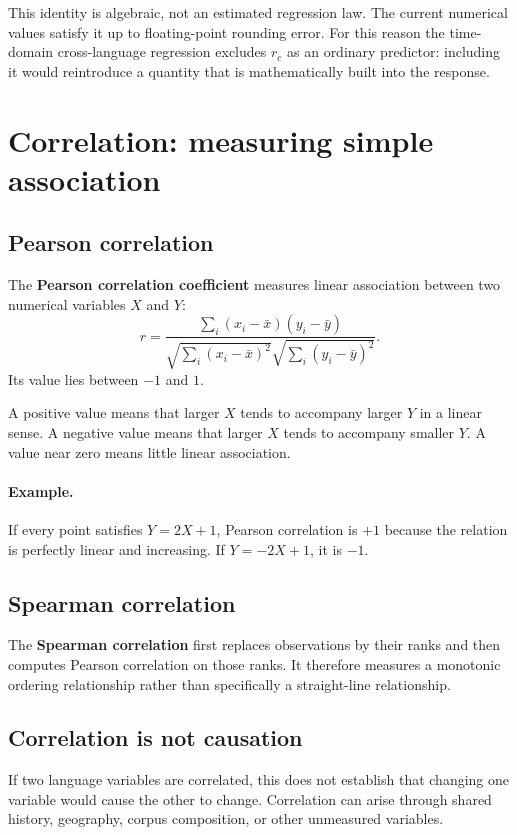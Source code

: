 \documentclass[11pt]{article}
\begin{document}
This identity is algebraic, not an estimated regression law. The current numerical values satisfy it up to floating-point rounding error. For this reason the time-domain cross-language regression excludes $r_c$ as an ordinary predictor: including it would reintroduce a quantity that is mathematically built into the response.

\newpage
\section{Correlation: measuring simple association}

\subsection{Pearson correlation}
The \textbf{Pearson correlation coefficient} measures linear association between two numerical variables $X$ and $Y$:
\[
\boxed{
r=\frac{\sum_i(x_i-\bar x)(y_i-\bar y)}
{\sqrt{\sum_i(x_i-\bar x)^2}\sqrt{\sum_i(y_i-\bar y)^2}}.}
\]
Its value lies between $-1$ and $1$.

A positive value means that larger $X$ tends to accompany larger $Y$ in a linear sense. A negative value means that larger $X$ tends to accompany smaller $Y$. A value near zero means little linear association.

\paragraph{Example.}
If every point satisfies $Y=2X+1$, Pearson correlation is $+1$ because the relation is perfectly linear and increasing. If $Y=-2X+1$, it is $-1$.

\subsection{Spearman correlation}
The \textbf{Spearman correlation} first replaces observations by their ranks and then computes Pearson correlation on those ranks. It therefore measures a monotonic ordering relationship rather than specifically a straight-line relationship.

\subsection{Correlation is not causation}
If two language variables are correlated, this does not establish that changing one variable would cause the other to change. Correlation can arise through shared history, geography, corpus composition, or other unmeasured variables.
\end{document}
